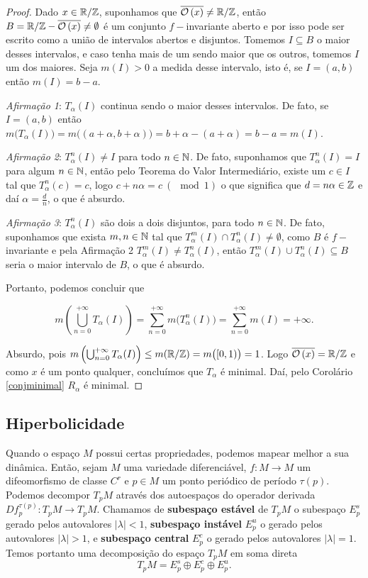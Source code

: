 \begin{proof} Dado $x\in\mathbb{R}/\mathbb{Z}$, suponhamos que $\overline{\mathcal{O}\left(x\right)}\neq\mathbb{R}/\mathbb{Z}$, então $B=\mathbb{R}/\mathbb{Z}-\overline{\mathcal{O}\left(x\right)}\neq\emptyset$ é um conjunto $f-$invariante aberto e por isso pode ser escrito como a união de intervalos abertos e disjuntos. Tomemos $I\subseteq B$ o maior desses intervalos, e caso tenha mais de um sendo maior que os outros, tomemos $I$ um dos maiores. Seja $m(I)>0$ a medida desse intervalo, isto é, se $I=(a,b)$ então $m(I)=b-a$.

\textit{Afirmação 1}: $T_{\alpha}(I)$ continua sendo o maior desses intervalos. De fato, se $I=(a,b)$ então $m\big(T_{\alpha}(I)\big)=m\big((a+\alpha,b+\alpha)\big)=b+\alpha-(a+\alpha)=b-a=m(I)$. 

\textit{Afirmação 2}: $T_{\alpha}^n(I)\neq I$ para todo $n\in\mathbb{N}$. De fato, suponhamos que $T_{\alpha}^n(I)=I$ para algum $n\in\mathbb{N}$, então pelo Teorema do Valor Intermediário, existe um $c\in I$ tal que $T^n_{\alpha}(c)=c$, logo $c+n\alpha=c\ (\mod 1)$ o que significa que $d=n\alpha\in\mathbb{Z}$ e daí $\alpha=\frac{d}{n}$, o que é absurdo.

\textit{Afirmação 3}: $T_{\alpha}^n(I)$ são dois a dois disjuntos, para todo $n\in\mathbb{N}$. De fato, suponhamos que exista $m,n\in\mathbb{N}$ tal que $T_{\alpha}^m(I)\cap T_{\alpha}^n(I)\neq\emptyset$, como $B$ é $f-$invariante e pela Afirmação 2 $T_{\alpha}^m(I)\neq T_{\alpha}^n(I)$, então $T_{\alpha}^m(I)\cup T_{\alpha}^n(I)\subseteq B$ seria o maior intervalo de $B$, o que é absurdo.

Portanto, podemos concluir que 

\begin{equation*}
m\left(\bigcup_{n=0}^{+\infty}T_{\alpha}(I)\right)=\sum_{n=0}^{+\infty}m\big(T_{\alpha}^n(I)\big)=\sum_{n=0}^{+\infty}m(I)=+\infty.
\end{equation*}

Absurdo, pois $m\left(\bigcup_{n=0}^{+\infty}T_{\alpha}(I)\right)\leq m(\mathbb{R}/\mathbb{Z})=m\big([0,1)\big)=1$. Logo $\overline{\mathcal{O}\left(x\right)}=\mathbb{R}/\mathbb{Z}$ e como $x$ é um ponto qualquer, concluímos que $T_{\alpha}$ é minimal. Daí, pelo Corolário \ref{conjminimal} $R_{\alpha}$ é minimal.
\end{proof}


\subsection{Hiperbolicidade}

Quando o espaço $M$ possui certas propriedades, podemos mapear melhor a sua dinâmica. Então, sejam $M$ uma variedade diferenciável, $f:M\to M$ um difeomorfismo de classe $C^r$ e $p\in M$ um ponto periódico de período $\tau(p)$. Podemos decompor $T_pM$ através dos autoespaços do operador derivada $Df_p^{\tau(p)}:T_pM\to T_{p}M$. Chamamos de \textbf{subespaço estável} de $T_pM$ o subespaço $E_p^s$ gerado pelos autovalores $|\lambda|<1$, \textbf{subespaço instável} $E_p^u$ o gerado pelos autovalores $|\lambda|>1$, e \textbf{subespaço central} $E_p^c$ o gerado pelos autovalores $|\lambda|=1$. Temos portanto uma decomposição do espaço $T_pM$ em soma direta
\begin{equation*}
T_pM=E_p^s\oplus E_p^c\oplus E_p^u.
\end{equation*}

